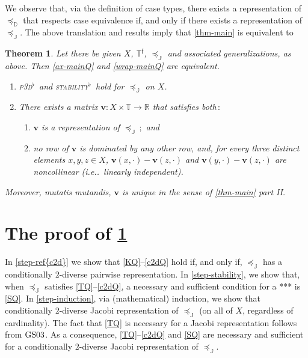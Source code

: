 \documentclass[ecta,nameyear,draft]{econsocart}
\makeatletter
\newcommand{\R}{\mathbb R}
\newcommand{\novel}{\mathfrak f}
\newcommand{\preceqb}{\mathbin{\preceq}}
\newcommand{\mbbd}{{\mathds D}}
\newcommand{\mbbt}{{\mathds {T}}}
\newcommand{\mbbtp}{{\mathds{T}^\novel}}
\newcommand{\mbbj}{\mathds J}
\newcommand{\stabilityq}{\textsc{{stability}$^\flat$}}
\newcommand{\parthreedivq}{\textsc{p3d}$^\flat$}
\newcommand\ie{i\@.e\@ifnextchar.{}{.\@}}
\newcommand{\gsii}{$\textup{GS03}$}
\theoremstyle{plain}
\newtheorem{theorem}{Theorem}%
\theoremstyle{remark}
\makeatother
\begin{document}
\begin{appendix}
  We observe that, via the definition of case types, there exists a
  representation of $\preceq_{\mbbd}$ that respects case equivalence if, and
  only if there exists a representation of $\preceq_{\mbbj}$. The above
  translation and results imply that \cref{thm-main} is equivalent to
  \begin{theorem}\label{thm-mainQ} Let there be given $X$, $\mbbtp$,
    $\preceqb_{\mbbj}$ and associated generalizations, as above. Then
    \ref{ax-mainQ} and \ref{wrap-mainQ} are equivalent.
    \begin{enumerate}[label=\textup{(\ref{thm-mainQ}.\roman*)}]
      \item\label{ax-mainQ} \parthreedivq\ and \stabilityq\ hold for 
        $\preceqb _ {\mbbj}$ on $X$.
      \item\label{wrap-mainQ} There exists a matrix $\mathbf{v} : X \times
        \mbbt \rightarrow \R$ that satisfies both$\,:$
        \begin{enumerate}[label=\textup{(\ref{thm-mainQ}.\alph*)}]
          \item\label{rep-mainQ} $\mathbf{v}$ is a representation of $\preceq _
            {\mbbj}\,;$ and
          \item\label{rows-mainQ} no row of $\mathbf{v}$ is dominated by any
            other row, and, for every three distinct elements $x,y, z \in X$,
            $\mathbf{v}(x,\cdot)-\mathbf{v}(z,\cdot) $ and
            $\mathbf{v}(y,\cdot)-\mathbf{v}(z,\cdot)$ are noncollinear (\ie\
            linearly independent).
        \end{enumerate}
    \end{enumerate}
    Moreover, \emph{mutatis mutandis}, $\mathbf{v}$ is unique in the sense of
    \cref{thm-main} part II.
  \end{theorem}

  \section{The proof of \cref{thm-mainQ}}\label{sec-proof-mainQ} 
    In \cref{step-ref{c2d}} we show that
    \ref{KQ}–\ref{c2dQ} hold if, and only if, $\preceq_{\mbbj}$ has a
    conditionally $2$-diverse pairwise representation.  In
    \cref{step-stability}, we show that, when $\preceq_{\mbbj}$ satisfies
    \ref{TQ}–\ref{c2dQ}, a necessary and sufficient condition for a *** is
    \ref{SQ}. In \cref{step-induction}, via (mathematical) induction, we
    show that conditionally $2$-diverse Jacobi representation of
    $\preceq_{\mbbj}$ (on all of $X$, regardless of cardinality). The fact that
    \ref{TQ} is necessary for a Jacobi representation follows from \gsii.  As a
    consequence, \ref{TQ}–\ref{c2dQ} and \ref{SQ} are necessary and sufficient
    for a conditionally $2$-diverse Jacobi representation of $\preceq_{\mbbj}$.
  

\end{appendix}
\end{document}
